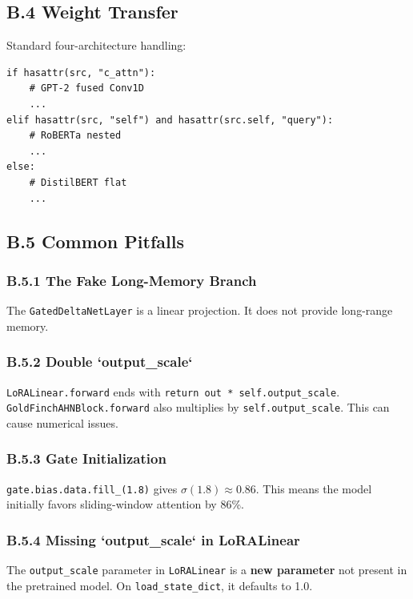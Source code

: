 \subsection{B.4 Weight Transfer}

Standard four-architecture handling:

\begin{lstlisting}
if hasattr(src, "c_attn"):
    # GPT-2 fused Conv1D
    ...
elif hasattr(src, "self") and hasattr(src.self, "query"):
    # RoBERTa nested
    ...
else:
    # DistilBERT flat
    ...
\end{lstlisting}

\subsection{B.5 Common Pitfalls}

\subsubsection{B.5.1 The Fake Long-Memory Branch}

The \texttt{GatedDeltaNetLayer} is a linear projection. It does not provide long-range 
memory.

\subsubsection{B.5.2 Double `output\_scale`}

\texttt{LoRALinear.forward} ends with \texttt{return out * self.output\_scale}. 
\texttt{GoldFinchAHNBlock.forward} also multiplies by \texttt{self.output\_scale}. This 
can cause numerical issues.

\subsubsection{B.5.3 Gate Initialization}

\texttt{gate.bias.data.fill\_(1.8)} gives $\sigma(1.8) \approx 0.86$. This means 
the model initially favors sliding-window attention by 86\%.

\subsubsection{B.5.4 Missing `output\_scale` in LoRALinear}

The \texttt{output\_scale} parameter in \texttt{LoRALinear} is a \textbf{new parameter} not 
present in the pretrained model. On \texttt{load\_state\_dict}, it defaults to 1.0.

